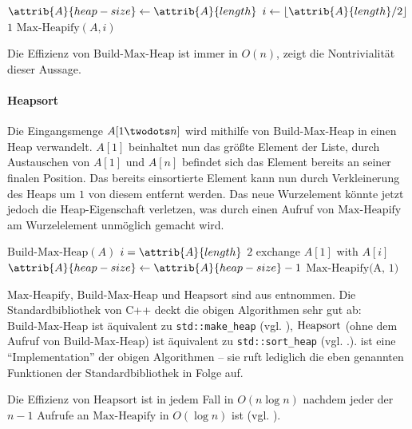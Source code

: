 \begin{codebox}
    \li $\attrib{A}{heap-size} \gets \attrib{A}{length}$
    \li \For $i \gets \lfloor \attrib{A}{length}/2 \rfloor$ \Downto $1$
    \li     \Do
                $\text{Max-Heapify}(A, i)$
            \End
\end{codebox}

Die Effizienz von $\text{Build-Max-Heap}$ ist immer in $O(n)$, \cite[155]{taocp3} zeigt die Nontrivialität dieser Aussage.

\paragraph{Heapsort}

Die Eingangsmenge $A[1 \twodots n]$ wird mithilfe von $\text{Build-Max-Heap}$ in einen Heap verwandelt. $A[1]$ beinhaltet nun das größte Element der Liste, durch Austauschen von $A[1]$ und $A[n]$ befindet sich das Element bereits an seiner finalen Position. Das bereits einsortierte Element kann nun durch Verkleinerung des Heaps um $1$ von diesem entfernt werden. Das neue Wurzelement könnte jetzt jedoch die Heap-Eigenschaft verletzen, was durch einen Aufruf von $\text{Max-Heapify}$ am Wurzelelement unmöglich gemacht wird.

\begin{codebox}
    \li $\text{Build-Max-Heap}(A)$
    \li \For $i = \attrib{A}{length}$ \Downto $2$
    \li     \Do
                exchange $A[1]$ with $A[i]$
    \li         $\attrib{A}{heap-size} \gets \attrib{A}{heap-size} - 1$
    \li         $\text{Max-Heapify(A, 1)}$
            \End
\end{codebox}

$\text{Max-Heapify}$, $\text{Build-Max-Heap}$ und $\text{Heapsort}$ sind aus \cite[154, 157]{clrs2001} entnommen. Die Standardbibliothek von C++ deckt die obigen Algorithmen sehr gut ab: $\text{Build-Max-Heap}$ ist äquivalent zu \lstinline{std::make_heap} (vgl. \cite[933]{ISO-C++17}), $\text{Heap\-sort}$ (ohne dem Aufruf von $\text{Build-Max-Heap}$) ist äquivalent zu  \lstinline{std::sort_heap} (vgl. \cite[933]{ISO-C++17}.).  ist eine \enquote{Implementation} der obigen Algorithmen -- sie ruft lediglich die eben genannten Funktionen der Standardbibliothek in Folge auf.

Die Effizienz von $\text{Heapsort}$ ist in jedem Fall in $O(n \log n)$ nachdem jeder der $n - 1$ Aufrufe an $\text{Max-Heapify}$ in $O(\log n)$ ist (vgl. \cite[160]{clrs2001}).

